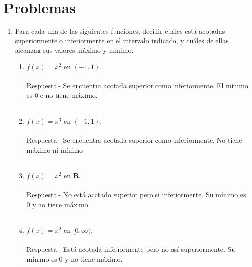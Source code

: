 \section{Problemas}

\begin{enumerate}[\bfseries 1.]

\item Para cada una de las siguientes funciones, decidir cuáles está acotadas superiormente o inferiormente en el intervalo indicado, y cuáles de ellas alcanzan sus valores máximo y mínimo.

    \begin{enumerate}[\bfseries (i)]

	\item $f(x) = x^2$ en $(-1,1)$.\\\\
	    Respuesta.-\; Se encuentra acotada superior como inferiormente. El mínimo es $0$ e no tiene máximo.\\\\

	\item $f(x) = x^3$ en  $(-1,1)$.\\\\
	    Respuesta.-\; Se encuentra acotada superior como inferiormente. No tiene máximo ni mínimo\\\\

	\item $f(x) = x^2$ en $\mathbf{R}$.\\\\
	    Respuesta.-\; No está acotado superior pero si inferiormente. Su mínimo es $0$ y no tiene  máximo.\\\\ 

	\item $f(x)=x^2$ en $[0,\infty)$.\\\\
	    Respuesta.-\; Está acotada inferiormente pero no así superiormente. Su mínimo es $0$ y no tiene máximo.\\\\ 


\end{enumerate}
\end{enumerate}
